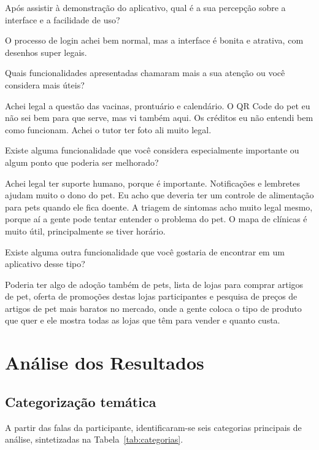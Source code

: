 \documentclass[12pt,a4paper]{article}
\newenvironment{turnos}
  {\begin{list}{}{%
     \setlength{\leftmargin}{2.2cm}%
     \setlength{\labelwidth}{2.0cm}%
     \setlength{\labelsep}{0.2cm}%
     \setlength{\itemsep}{0.6em}%
     \setlength{\parsep}{0pt}}}
  {\end{list}}
\newcommand{\fala}[1]{\item[\textbf{#1}\hfill]}
\begin{document}
\begin{turnos}

\fala{E:} Após assistir à demonstração do aplicativo, qual é a sua percepção sobre a
interface e a facilidade de uso?

\fala{P:} O processo de login achei bem normal, mas a interface é bonita e atrativa,
com desenhos super legais.

\fala{E:} Quais funcionalidades apresentadas chamaram mais a sua atenção ou você considera
mais úteis?

\fala{P:} Achei legal a questão das vacinas, prontuário e calendário. O QR Code do pet
eu não sei bem para que serve, mas vi também aqui. Os créditos eu não entendi bem como
funcionam. Achei o tutor ter foto ali muito legal.

\fala{E:} Existe alguma funcionalidade que você considera especialmente importante ou
algum ponto que poderia ser melhorado?

\fala{P:} Achei legal ter suporte humano, porque é importante. Notificações e lembretes
ajudam muito o dono do pet. Eu acho que deveria ter um controle de alimentação para pets
quando ele fica doente. A triagem de sintomas acho muito legal mesmo, porque aí a gente
pode tentar entender o problema do pet. O mapa de clínicas é muito útil, principalmente
se tiver horário.

\fala{E:} Existe alguma outra funcionalidade que você gostaria de encontrar em um aplicativo
desse tipo?

\fala{P:} Poderia ter algo de adoção também de pets, lista de lojas para comprar artigos
de pet, oferta de promoções destas lojas participantes e pesquisa de preços de artigos de
pet mais baratos no mercado, onde a gente coloca o tipo de produto que quer e ele mostra
todas as lojas que têm para vender e quanto custa.

\end{turnos}

\section{Análise dos Resultados}

\subsection{Categorização temática}

A partir das falas da participante, identificaram-se seis categorias principais de análise,
sintetizadas na Tabela~\ref{tab:categorias}.
\end{document}
